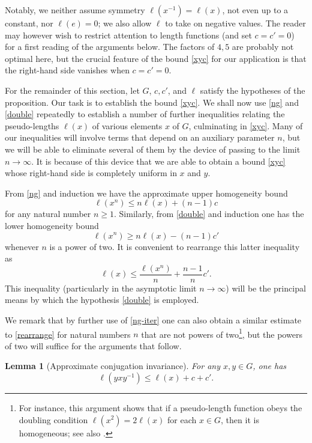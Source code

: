 \documentclass[11pt,a4paper,reqno]{amsart}
\numberwithin{equation}{section}
\theoremstyle{plain}
\newtheorem{lemma}[equation]{Lemma}
\theoremstyle{definition}
\newcommand\normsymb{\ell}  %
\newcommand\norm[1]{\ell({#1})}   %
\begin{document}
Notably, we neither assume symmetry $\norm{ x^{-1} } = \norm{ x }$, not
even up to a constant, nor $\norm{ e } = 0$; we also allow $\normsymb$ to
take on negative values.  The reader may however wish to restrict
attention to length functions (and set $c=c'=0$) for a first reading of
the arguments below.   The factors of $4,5$ are probably not optimal
here, but the crucial feature of the bound \eqref{xyc} for our
application is that the right-hand side vanishes when $c=c'=0$.

For the remainder of this section, let $G$, $c,c'$, and $\normsymb$
satisfy the hypotheses of the proposition.  Our task is to establish the
bound \eqref{xyc}.  We shall now use \eqref{ng} and \eqref{double}
repeatedly to establish a number of further inequalities relating the
pseudo-lengths $\norm{x}$ of various elements $x$ of $G$, culminating in
\eqref{xyc}.
Many of our inequalities will involve terms that depend on an auxiliary
parameter $n$, but we will be able to eliminate several of them by the
device of passing to the limit $n \to \infty$.  It is because of this
device that we are able to obtain a bound \eqref{xyc} whose right-hand
side is completely uniform in $x$ and $y$.

From \eqref{ng} and induction we have the approximate upper homogeneity
bound
\begin{equation}\label{ng-iter}
 \norm{x^n} \leq n \norm{x} + (n-1) c
\end{equation}
for any natural number $n \geq 1$.  Similarly, from \eqref{double} and
induction one has the lower homogeneity bound
\[
\norm{x^n} \geq n \norm{x} - (n-1) c'
\]
whenever $n$ is a power of two.  It is convenient to rearrange this
latter inequality as
\begin{equation}\label{rearrange}
\norm{x} \leq \frac{\norm{x^n}}{n}  + \frac{n-1}{n} c'.
\end{equation}
This inequality (particularly in the asymptotic limit $n \to \infty$)
will be the principal means by which the hypothesis \eqref{double} is
employed.

We remark that by further use of \eqref{ng-iter} one can also obtain a
similar estimate to \eqref{rearrange} for natural numbers $n$ that are
not powers of two\footnote{For instance, this argument shows that if a
pseudo-length function obeys the doubling condition
$\norm{x^2}=2\norm{x}$ for each $x\in G$, then it is homogeneous; see
also \cite[Lemma 1]{GK}.}, but the powers of two will suffice for the
arguments that follow.

\begin{lemma}[Approximate conjugation invariance]\label{aci}
For any $x,y \in G$, one has
\[
\norm{yxy^{-1} } \leq \norm{ x } + c + c'.
\]
\end{lemma}
\end{document}
